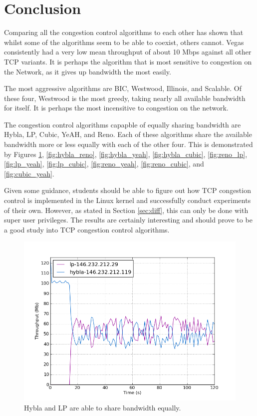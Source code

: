 \documentclass[11pt,a4paper,twocolumn]{article}
\begin{document}
\section{Conclusion}
\label{sec:conc}
Comparing all the congestion control algorithms to each other has shown that whilst some of the algorithms
seem to be able to coexist, others cannot. Vegas consistently had a very low mean throughput of about 10 Mbps
against all other TCP variants. It is perhaps the algorithm that is most sensitive to congestion on the Network, as it gives up bandwidth the most easily. 

The most aggressive algorithms are BIC, Westwood, Illinois, and Scalable. Of these four, Westwood is the most
greedy, taking nearly all available bandwidth for itself. It is perhaps the most incensitive to congestion on the network.

The congestion control algorithms capapble of equally sharing bandwidth are Hybla, LP, Cubic, YeAH, and Reno.
Each of these algorithms share the available bandwidth more or less equally with each of the other four. This is demonstrated by Figures \ref{fig:hybla_lp}, \ref{fig:hybla_reno}, \ref{fig:hybla_yeah}, \ref{fig:hybla_cubic}, \ref{fig:reno_lp}, \ref{fig:lp_yeah}, \ref{fig:lp_cubic}, \ref{fig:reno_yeah}, \ref{fig:reno_cubic}, and \ref{fig:cubic_yeah}.

Given some guidance, students should be able to figure out how TCP congestion control is implemented in the Linux kernel and successfully conduct experiments of their own.
However, as stated in Section \ref{sec:diff}, this can only be done with super user privileges. The results are certainly interesting and should prove to be a good study into
TCP congestion control algorithms.

\begin{figure}[p]
	\includegraphics[width=\linewidth]{exp14.png}
	\caption{Hybla and LP are able to share bandwidth equally.}
	\label{fig:hybla_lp}
\end{figure}
\end{document}
